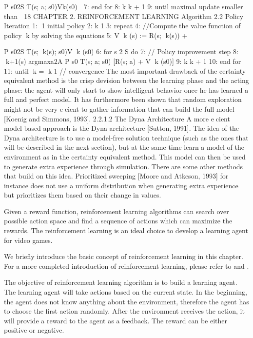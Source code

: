 P
s02S T(s; a; s0)Vk(s0)

7: end for
8: k   k + 1
9: until maximal update smaller than 
18 CHAPTER 2. REINFORCEMENT LEARNING
Algorithm 2.2 Policy Iteration
1: 1   initial policy
2: k   1
3: repeat
4: //Compute the value function of policy k by solving the equations
5: V k (s) := R(s; k(s)) + 

P
s02S T(s; k(s); s0)V k (s0)
6: for s 2 S do
7: // Policy improvement step
8: k+1(s)   argmaxa2A
P
s0 T(s; a; s0) [R(s; a) + 
V k (s0)]
9: k   k + 1
10: end for
11: until k = k􀀀1 // convergence
The most important drawback of the certainty equivalent method is the
crisp devision between the learning phase and the acting phase: the agent will
only start to show intelligent behavior once he has learned a full and perfect
model. It has furthermore been shown that random exploration might not be
very ecient to gather information that can build the full model [Koenig and
Simmons, 1993].
2.2.1.2 The Dyna Architecture
A more ecient model-based approach is the Dyna architecture [Sutton, 1991].
The idea of the Dyna architecture is to use a model-free solution technique
(such as the ones that will be described in the next section), but at the same
time learn a model of the environment as in the certainty equivalent method.
This model can then be used to generate extra experience through simulation.
There are some other methods that build on this idea. Prioritized sweeping
[Moore and Atkeson, 1993] for instance does not use a uniform distribution
when generating extra experience but prioritizes them based on their change
in values.


Given a reward function, reinforcement learning algorithms can
search over possible action space and find a sequence of actions 
which can maximize the rewards. The reinforcement learning is an ideal choice
to develop a learning agent for video games.

We briefly introduce the basic concept of reinforcement learning in this chapter. 
For a more completed introduction of reinforcement learning, please refer to
\cite{SuttonIntro} and \cite{KevinIntro}.

The objective of reinforcement learning algorithm is to build a learning agent. The learning agent will take
actions based on the current state. In the beginning, the agent does not know anything about 
the environment, therefore the agent has to choose the first action randomly. After the environment
receives the action, it will provide a reward to the agent as a feedback. The reward can be either
positive or negative.

